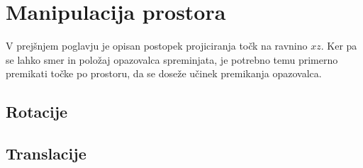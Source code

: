 \documentclass[a4paper, 12px]{article}
\begin{document}
\section{Manipulacija prostora}
    V prejšnjem poglavju je opisan postopek projiciranja točk na ravnino $xz$.
    Ker pa se lahko smer in položaj opazovalca spreminjata, je potrebno temu primerno premikati
    točke po prostoru, da se doseže učinek premikanja opazovalca.
    \subsection{Rotacije}
    \subsection{Translacije}

\printbibliography
\end{document}
